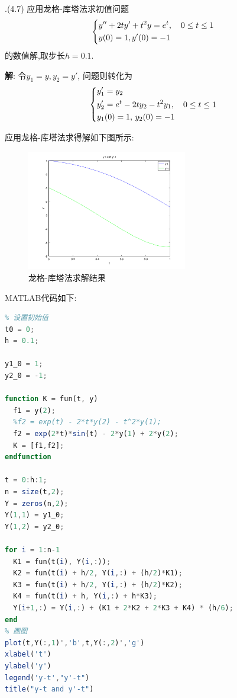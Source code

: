 \documentclass{ctexart}
\newcounter{mycnt}
\newenvironment{problem}[1][1.1]{\noindent \stepcounter{mycnt}\themycnt.(#1)}{

}
\newenvironment{answer}{\textbf{解}:}{
\vspace{0.5cm}
}
\begin{document}
\begin{problem}[4.7]
  应用龙格-库塔法求初值问题
  \begin{equation}
    \left\{
    \begin{lgathered}
      y'' + 2ty' + t^2 y = e^t, \quad 0 \leq t \leq 1 \\
      y(0) = 1, y'(0) = -1
    \end{lgathered}
    \right.
  \end{equation}
的数值解,取步长$h = 0.1$.
\end{problem}

\begin{answer}
  令$y_1 = y, y_2 = y'$, 问题则转化为
  \begin{equation}
    \left\{
      \begin{lgathered}
        y_1' = y_2 \\
        y_2' = e^t - 2ty_2 - t^2y_1, \quad 0\leq t \leq 1 \\
        y_1(0) = 1, \, y_2(0) = -1
      \end{lgathered}
    \right.
  \end{equation}

应用龙格-库塔法求得解如下图所示:
\begin{figure}[H]
  \centering
  \includegraphics[width=7cm]{code/fig1.png}
  \caption{龙格-库塔法求解结果}
\end{figure}

MATLAB代码如下:
\begin{lstlisting}[language=Octave]
% 第二题 应用龙格-库塔法求初值问题
% 设置初始值
t0 = 0;
h = 0.1;

y1_0 = 1;
y2_0 = -1;

function K = fun(t, y)
  f1 = y(2);
  %f2 = exp(t) - 2*t*y(2) - t^2*y(1);
  f2 = exp(2*t)*sin(t) - 2*y(1) + 2*y(2);
  K = [f1,f2];
endfunction

t = 0:h:1;
n = size(t,2);
Y = zeros(n,2);
Y(1,1) = y1_0;
Y(1,2) = y2_0;

for i = 1:n-1
  K1 = fun(t(i), Y(i,:));
  K2 = fun(t(i) + h/2, Y(i,:) + (h/2)*K1);
  K3 = fun(t(i) + h/2, Y(i,:) + (h/2)*K2);
  K4 = fun(t(i) + h, Y(i,:) + h*K3);
  Y(i+1,:) = Y(i,:) + (K1 + 2*K2 + 2*K3 + K4) * (h/6);
end
% 画图
plot(t,Y(:,1)','b',t,Y(:,2)','g')
xlabel('t')
ylabel('y')
legend('y-t',"y'-t")
title("y-t and y'-t")
\end{lstlisting}
\end{answer}
\end{document}
